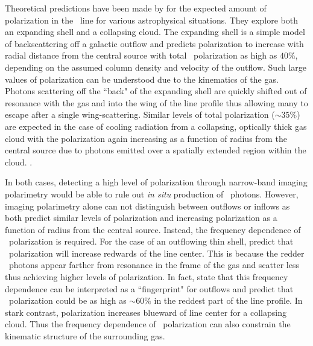 Theoretical predictions have been made by \cite{DijkstraLoeb2008} for the expected amount of polarization in the \lya~line for various astrophysical situations. They explore both an expanding shell and a collapsing cloud. The expanding shell is a simple model of backscattering off a galactic outflow and predicts polarization to increase with radial distance from the central source with total \lya~polarization as high as $40\%$, depending on the assumed column density and velocity of the outflow. Such large values of polarization can be understood due to the kinematics of the gas. Photons scattering off the ``back" of the expanding shell are quickly shifted out of resonance with the gas and into the wing of the line profile thus allowing many to escape after a single wing-scattering.  Similar levels of total polarization (\pol$\sim35\%$) are expected in the case of cooling radiation from a collapsing, optically thick gas cloud with the polarization again increasing as a function of radius from the central source due to photons emitted over a spatially extended region within the cloud. . 

In both cases, detecting a high level of polarization through narrow-band imaging polarimetry would be able to rule out \textit{in situ} production of \lya~photons. However, imaging polarimetry alone can not distinguish between outflows or inflows as both predict similar levels of polarization and increasing polarization as a function of radius from the central source. Instead, the frequency dependence of \lya~polarization is required. For the case of an outflowing thin shell, \cite{DijkstraLoeb2008} predict that \lya~polarization will increase redwards of the line center. This is because the redder \lya~photons appear farther from resonance in the frame of the gas and scatter less thus achieving higher levels of polarization. In fact, \cite{DijkstraLoeb2008} state that this frequency dependence can be interpreted as a ``fingerprint" for outflows and predict that \lya~polarization could be as high as $\sim60\%$ in the reddest part of the line profile.  In stark contrast, polarization  increases blueward of line center for a collapsing cloud. Thus the frequency dependence of \lya~polarization can also constrain the kinematic structure of the surrounding gas.

